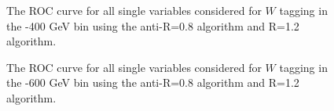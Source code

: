 \begin{figure}
\begin{center}
\caption{The ROC curve for all single variables considered for $W$
tagging in the -400 GeV bin using the anti-\kT R=0.8 algorithm and R=1.2 algorithm.}
\label{fig:pt300_single}
\end{center}
\end{figure}


\begin{figure}
\begin{center}
\caption{The ROC curve for all single variables considered for $W$
tagging in the -600 GeV bin using the anti-\kT R=0.8 algorithm and R=1.2 algorithm.}
\label{fig:pt500_single}
\end{center}
\end{figure}

